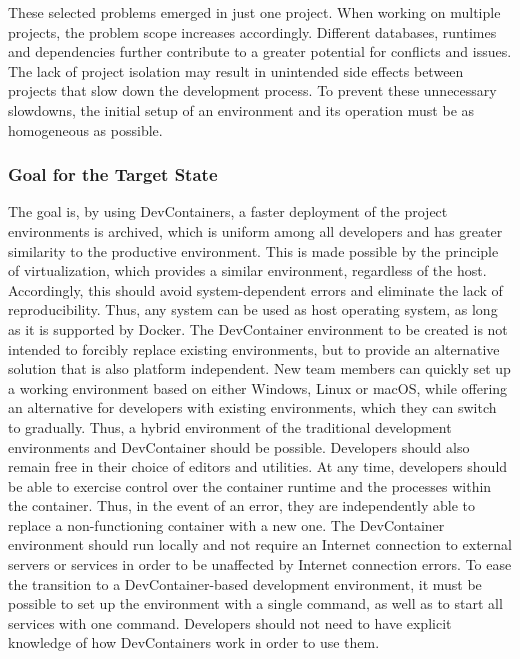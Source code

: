         These selected problems emerged in just one project. When working on multiple projects, the problem scope increases accordingly. Different databases, runtimes and dependencies further contribute to a greater potential for conflicts and issues. The lack of project isolation may result in unintended side effects between projects that slow down the development process. To prevent these unnecessary slowdowns, the initial setup of an environment and its operation must be as homogeneous as possible.

        \subsubsection{Goal for the Target State}\label{sssec::goal}
        The goal is, by using DevContainers, a faster deployment of the project environments is archived, which is uniform among all developers and has greater similarity to the productive environment. This is made possible by the principle of virtualization, which provides a similar environment, regardless of the host. Accordingly, this should avoid system-dependent errors and eliminate the lack of reproducibility. Thus, any system can be used as host operating system, as long as it is supported by Docker. The DevContainer environment to be created is not intended to forcibly replace existing environments, but to provide an alternative solution that is also platform independent. New team members can quickly set up a working environment based on either Windows, Linux or macOS, while offering an alternative for developers with existing environments, which they can switch to gradually. Thus, a hybrid environment of the traditional development environments and DevContainer should be possible. Developers should also remain free in their choice of editors and utilities.\newline
        At any time, developers should be able to exercise control over the container runtime and the processes within the container. Thus, in the event of an error, they are independently able to replace a non-functioning container with a new one. The DevContainer environment should run locally and not require an Internet connection to external servers or services in order to be unaffected by Internet connection errors. To ease the transition to a DevContainer-based development environment, it must be possible to set up the environment with a single command, as well as to start all services with one command. Developers should not need to have explicit knowledge of how DevContainers work in order to use them.

